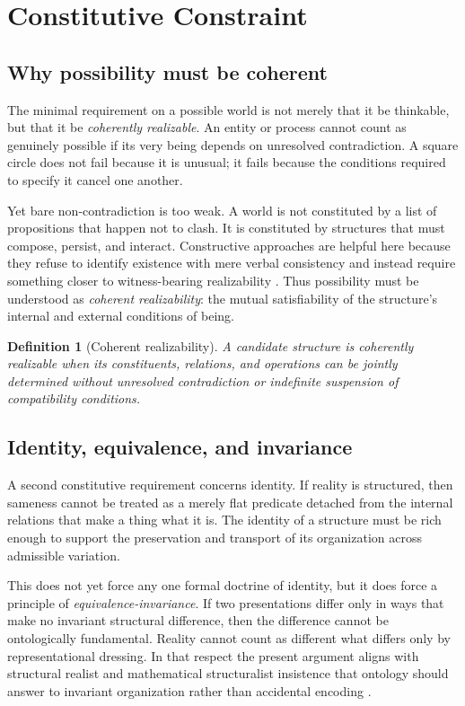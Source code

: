 \documentclass[11pt]{article}
\theoremstyle{foundation}
\newtheorem{definition}{Definition}
\begin{document}
\section{Constitutive Constraint}

\subsection{Why possibility must be coherent}

The minimal requirement on a possible world is not merely that it be thinkable, but that it be \emph{coherently realizable}. An entity or process cannot count as genuinely possible if its very being depends on unresolved contradiction. A square circle does not fail because it is unusual; it fails because the conditions required to specify it cancel one another.

Yet bare non-contradiction is too weak. A world is not constituted by a list of propositions that happen not to clash. It is constituted by structures that must compose, persist, and interact. Constructive approaches are helpful here because they refuse to identify existence with mere verbal consistency and instead require something closer to witness-bearing realizability \citep{MartinLof1984,UF2013}. Thus possibility must be understood as \emph{coherent realizability}: the mutual satisfiability of the structure's internal and external conditions of being.

\begin{definition}[Coherent realizability]
A candidate structure is coherently realizable when its constituents, relations, and operations can be jointly determined without unresolved contradiction or indefinite suspension of compatibility conditions.
\end{definition}

\subsection{Identity, equivalence, and invariance}

A second constitutive requirement concerns identity. If reality is structured, then sameness cannot be treated as a merely flat predicate detached from the internal relations that make a thing what it is. The identity of a structure must be rich enough to support the preservation and transport of its organization across admissible variation.

This does not yet force any one formal doctrine of identity, but it does force a principle of \emph{equivalence-invariance}. If two presentations differ only in ways that make no invariant structural difference, then the difference cannot be ontologically fundamental. Reality cannot count as different what differs only by representational dressing. In that respect the present argument aligns with structural realist and mathematical structuralist insistence that ontology should answer to invariant organization rather than accidental encoding \citep{Worrall1989,Ladyman1998,French2014,Shapiro1997}.
\end{document}
